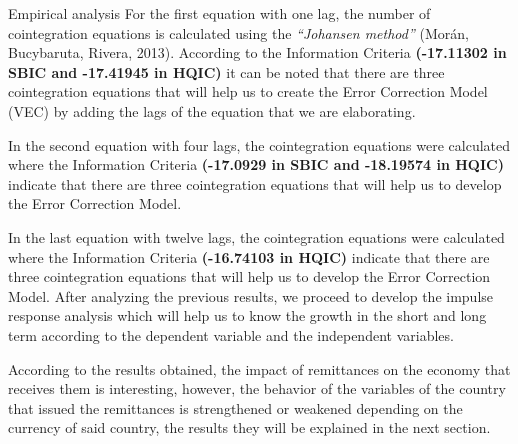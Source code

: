 \begin{frame}{Empirical analysis}
For the first equation with one lag, the number of cointegration equations is calculated using the \textit{“Johansen method”} (Morán, Bucybaruta, Rivera, 2013). According to the Information Criteria \textbf{(-17.11302 in SBIC and -17.41945 in HQIC)} it can be noted that there are three cointegration equations that will help us to create the Error Correction Model (VEC) by adding the lags of the equation that we are elaborating.\par
In the second equation with four lags, the cointegration equations were calculated where the Information Criteria \textbf{(-17.0929 in SBIC and -18.19574 in HQIC)} indicate that there are three cointegration equations that will help us to develop the Error Correction Model.\par
In the last equation with twelve lags, the cointegration equations were calculated where the Information Criteria \textbf{(-16.74103 in HQIC)} indicate that there are three cointegration equations that will help us to develop the Error Correction Model.
After analyzing the previous results, we proceed to develop the impulse response analysis which will help us to know the growth in the short and long term according to the dependent variable and the independent variables. \par
According to the results obtained, the impact of remittances on the economy that receives them is interesting, however, the behavior of the variables of the country that issued the remittances is strengthened or weakened depending on the currency of said country, the results they will be explained in the next section.\par
\end{frame}